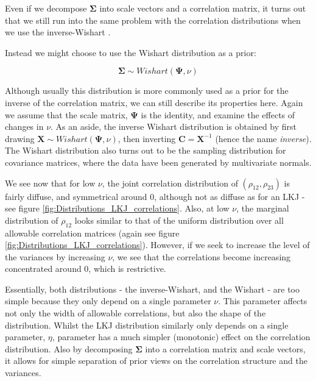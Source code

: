 \documentclass[11pt,fullpage]{book}
\begin{document}
Even if we decompose $\boldsymbol{\Sigma}$ into scale vectors and a correlation matrix, it turns out that we still run into the same problem with the correlation distributions when we use the inverse-Wishart \cite{tokuda2011visualizing}. 

Instead we might choose to use the Wishart distribution as a prior: 

\begin{equation}
\boldsymbol{\Sigma} \sim Wishart\left(\boldsymbol{\Psi},\nu\right)
\end{equation}

Although usually this distribution is more commonly used as a prior for the inverse of the correlation matrix, we can still describe its properties here. Again we assume that the scale matrix, $\boldsymbol{\Psi}$ is the identity, and examine the effects of changes in $\nu$. As an aside, the inverse Wishart distribution is obtained by first drawing $\boldsymbol{X} \sim Wishart\left(\boldsymbol{\Psi},\nu\right)$, then inverting $\boldsymbol{C}=\boldsymbol{X}^{-1}$ (hence the name \textit{inverse}). The Wishart distribution also turns out to be the sampling distribution for covariance matrices, where the data have been generated by multivariate normals.

We see now that for low $\nu$, the joint correlation distribution of $(\rho_{12},\rho_{23})$ is fairly diffuse, and symmetrical around 0, although not as diffuse as for an LKJ - see figure \ref{fig:Distributions_LKJ_correlations}. Also, at low $\nu$, the marginal distribution of $\rho_{12}$ looks similar to that of the uniform distribution over all allowable correlation matrices (again see figure \ref{fig:Distributions_LKJ_correlations}). However, if we seek to increase the level of the variances by increasing $\nu$, we see that the correlations become increasing concentrated around 0, which is restrictive.

Essentially, both distributions - the inverse-Wishart, and the Wishart - are too simple because they only depend on a single parameter $\nu$. This parameter affects not only the width of allowable correlations, but also the shape of the distribution. Whilst the LKJ distribution similarly only depends on a single parameter, $\eta$,  parameter has a much simpler (monotonic) effect on the correlation distribution. Also by decomposing $\boldsymbol{\Sigma}$ into a correlation matrix and scale vectors, it allows for simple separation of prior views on the correlation structure and the variances.
\end{document}
